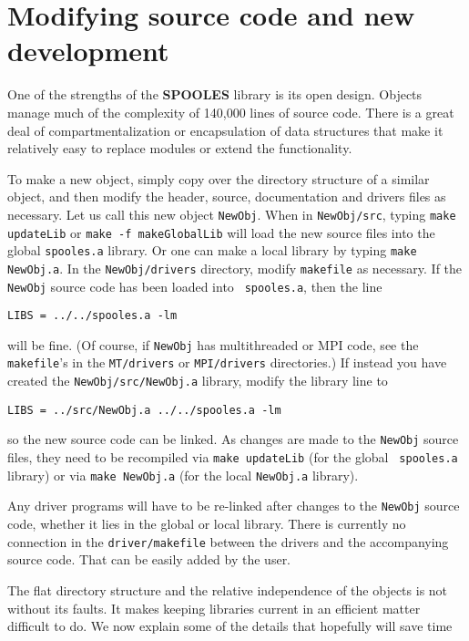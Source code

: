 \par
\section{Modifying source code and new development}
\par
One of the strengths of the {\bf SPOOLES} library is its open design.
Objects manage much of the complexity of 140,000 lines of source code.
There is a great deal of compartmentalization or encapsulation of
data structures that make it relatively easy to replace modules
or extend the functionality.
\par
To make a new object, simply copy over the directory structure of a
similar object, and then modify the header, source, documentation
and drivers files as necessary.
Let us call this new object {\tt NewObj}.
When in {\tt NewObj/src},
typing {\tt make updateLib} or {\tt make -f makeGlobalLib} will
load the new source files into the global {\tt spooles.a} library.
Or one can make a local library by typing {\tt make NewObj.a}.
In the {\tt NewObj/drivers} directory, modify {\tt makefile} as
necessary.
If the {\tt NewObj} source code has been loaded into {\tt
spooles.a}, then the line
\begin{verbatim}
LIBS = ../../spooles.a -lm
\end{verbatim}
will be fine.
(Of course, if {\tt NewObj} has multithreaded or MPI code,
see the {\tt makefile}'s in the {\tt MT/drivers} or {\tt MPI/drivers}
directories.)
If instead you have created the {\tt NewObj/src/NewObj.a} library,
modify the library line to 
\begin{verbatim}
LIBS = ../src/NewObj.a ../../spooles.a -lm
\end{verbatim}
so the new source code can be linked.
As changes are made to the {\tt NewObj} source files, they need to
be recompiled via {\tt make updateLib} (for the global {\tt
spooles.a} library) or via {\tt make NewObj.a} (for the local
{\tt NewObj.a} library).
\par
Any driver programs will have to be re-linked after changes to the
{\tt NewObj} source code, whether it lies in the global or local
library.
There is currently no connection in the {\tt driver/makefile} between
the drivers and the accompanying source code.
That can be easily added by the user.
\par
The flat directory structure and the relative independence of the
objects is not without its faults.
It makes keeping libraries current in an efficient matter difficult
to do.
We now explain some of the details that hopefully will save time
